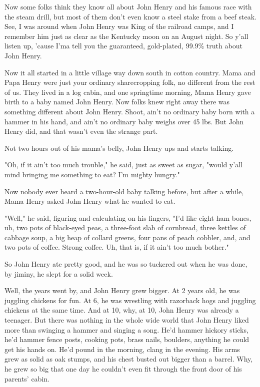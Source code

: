 Now some folks think they know all about John Henry and his famous race with the steam drill, but most of them don't even know a steel stake from a beef steak. See, I was around when John Henry was King of the railroad camps, and I remember him just as clear as the Kentucky moon on an August night. So y'all listen up, 'cause I'ma tell you the guaranteed, gold-plated, 99.9\% truth about John Henry.

Now it all started in a little village way down south in cotton country. Mama and Papa Henry were just your ordinary sharecropping folk, no different from the rest of us. They lived in a log cabin, and one springtime morning, Mama Henry gave birth to a baby named John Henry. Now folks knew right away there was something different about John Henry. Shoot, ain't no ordinary baby born with a hammer in his hand, and ain't no ordinary baby weighs over 45 lbs. But John Henry did, and that wasn't even the strange part.

Not two hours out of his mama's belly, John Henry ups and starts talking.

"Oh, if it ain't too much trouble," he said, just as sweet as sugar, "would y'all mind bringing me something to eat? I'm mighty hungry."

Now nobody ever heard a two-hour-old baby talking before, but after a while, Mama Henry asked John Henry what he wanted to eat.

"Well," he said, figuring and calculating on his fingers, "I'd like eight ham bones, uh, two pots of black-eyed peas, a three-foot slab of cornbread, three kettles of cabbage soup, a big heap of collard greens, four pans of peach cobbler, and, and two pots of coffee. Strong coffee. Uh, that is, if it ain't too much bother."

So John Henry ate pretty good, and he was so tuckered out when he was done, by jiminy, he slept for a solid week.

Well, the years went by, and John Henry grew bigger. At 2 years old, he was juggling chickens for fun. At 6, he was wrestling with razorback hogs and juggling chickens at the same time. And at 10, why, at 10, John Henry was already a teenager. But there was nothing in the whole wide world that John Henry liked more than swinging a hammer and singing a song. He'd hammer hickory sticks, he'd hammer fence posts, cooking pots, brass nails, boulders, anything he could get his hands on. He'd pound in the morning, clang in the evening. His arms grew as solid as oak stumps, and his chest busted out bigger than a barrel. Why, he grew so big that one day he couldn't even fit through the front door of his parents' cabin.

